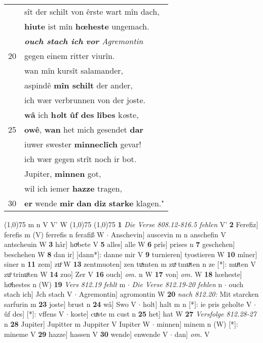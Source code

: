 \documentclass[8pt,a4paper,notitlepage]{article}
\begin{document}
\begin{table}[ht]
\begin{minipage}[t]{0.5\linewidth}
\begin{tabular}{rl}
 & sît der schilt von êrste wart mîn dach,\\ 
 & \textbf{hiute} ist mîn \textbf{hœheste} ungemach.\\ 
 & \textit{\textbf{ouch stach ich} \textbf{vor} Agremontin}\\ 
20 & gegen einem ritter viurîn.\\ 
 & wan mîn kursît salamander,\\ 
 & aspindê \textbf{mîn schilt} der ander,\\ 
 & ich wær verbrunnen von der joste.\\ 
 & \textbf{wâ} ich \textbf{h\textit{o}lt} \textbf{ûf des} \textbf{lîbes} k\textit{o}ste,\\ 
25 & \textbf{owê}, \textbf{wan} het mich gesendet \textbf{dar}\\ 
 & iuwer swester \textbf{minneclîch} gevar!\\ 
 & ich wær gegen strît noch ir bot.\\ 
 & Jupiter, \textbf{minnen} got,\\ 
 & wil ich iemer \textbf{hazze} tragen,\\ 
30 & \textbf{er} wende \textbf{mir} \textbf{dan} \textbf{diz} \textbf{starke} klagen."\\ 
\end{tabular}
\scriptsize
\line(1,0){75} \newline
m n V V' W \newline
\line(1,0){75} \newline
\newline
\line(1,0){75} \newline
\textbf{1} \textit{Die Verse 808.12-816.5 fehlen} V'  \textbf{2} Ferefiz] ferefis m (V) ferrefis n ferafiß W  $\cdot$ Anschevin] auscevin m n anschefin V antscheuin W \textbf{3} hâr] hoͮbete V \textbf{5} alles] alle W \textbf{6} prîs] prises n \textbf{7} geschehen] beschehen W \textbf{8} dan ir] [dann*]: danne mir V \textbf{9} turnieren] tyostieren W \textbf{10} mîner] siner n \textbf{11} zem] zuͦ W \textbf{13} zentmuoten] zen tuͯmten m zuͯ tmuͯten n ze [*]: muͦten V zuͦ trinuͦten W \textbf{14} zuo] Zer V \textbf{16} ouch] \textit{om.} n W \textbf{17} von] \textit{om.} W \textbf{18} hœheste] hoͯhestes n (W) \textbf{19} \textit{Vers 812.19 fehlt} m   $\cdot$ \textit{Die Verse 812.19-20 fehlen} n   $\cdot$ ouch stach ich] Jch stach V  $\cdot$ Agremontin] agromontin W \textbf{20} \textit{nach 812.20:} Mit starcken sarfurin m  \textbf{23} joste] brust n \textbf{24} wâ] Swo V  $\cdot$ holt] halt m n [*]: ie pris geholte V  $\cdot$ ûf des] [*]: vffens V  $\cdot$ koste] cuͯste m cust n \textbf{25} het] hat W \textbf{27} \textit{Versfolge 812.28-27} n  \textbf{28} Jupiter] Jupitter m Juppiter V Iupiter W  $\cdot$ minnen] minem n (W) [*]: mineme  V \textbf{29} hazze] hassen V \textbf{30} wende] enwende V  $\cdot$ dan] \textit{om.} V \newline
\end{minipage}
\end{table}
\end{document}
